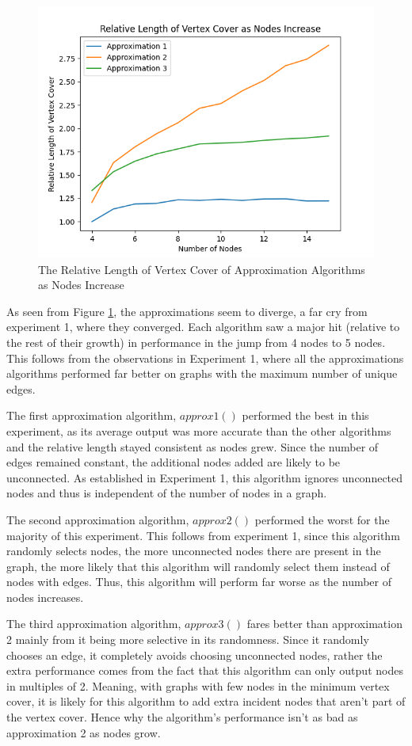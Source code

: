 \documentclass[titlepage]{article}
\begin{document}
\begin{figure}[H]
    \centering
    \includegraphics[width=0.8\linewidth]{experiment_3_2.png}
    \caption{The Relative Length of Vertex Cover of Approximation Algorithms as Nodes Increase}
    \label{fig:experiment_3_2}
\end{figure}

As seen from Figure \ref{fig:experiment_3_2}, the approximations seem to diverge, a far cry from experiment 1, where they converged. Each algorithm saw a major hit (relative to the rest of their growth) in performance in the jump from 4 nodes to 5 nodes. This follows from the observations in Experiment 1, where all the approximations algorithms performed far better on graphs with the maximum number of unique edges.

The first approximation algorithm, $approx1()$ performed the best in this experiment, as its average output was more accurate than the other algorithms and the relative length stayed consistent as nodes grew. Since the number of edges remained constant, the additional nodes added are likely to be unconnected. As established in Experiment 1, this algorithm ignores unconnected nodes and thus is independent of the number of nodes in a graph.

The second approximation algorithm, $approx2()$ performed the worst for the majority of this experiment. This follows from experiment 1, since this algorithm randomly selects nodes, the more unconnected nodes there are present in the graph, the more likely that this algorithm will randomly select them instead of nodes with edges. Thus, this algorithm will perform far worse as the number of nodes increases.

The third approximation algorithm, $approx3()$ fares better than approximation 2 mainly from it being more selective in its randomness. Since it randomly chooses an edge, it completely avoids choosing unconnected nodes, rather the extra performance comes from the fact that this algorithm can only output nodes in multiples of 2. Meaning, with graphs with few nodes in the minimum vertex cover, it is likely for this algorithm to add extra incident nodes that aren't part of the vertex cover. Hence why the algorithm's performance isn't as bad as approximation 2 as nodes grow.
\end{document}
